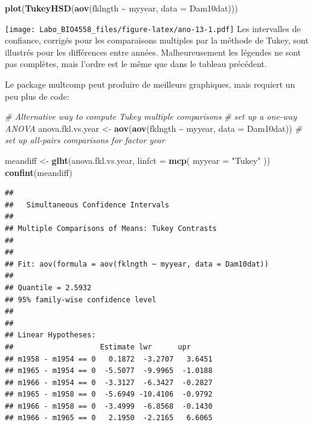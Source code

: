 \documentclass[
  12pt,
]{book}
\newenvironment{Shaded}{\begin{snugshade}}{\end{snugshade}}
\newcommand{\CommentTok}[1]{\textcolor[rgb]{0.56,0.35,0.01}{\textit{#1}}}
\newcommand{\DataTypeTok}[1]{\textcolor[rgb]{0.13,0.29,0.53}{#1}}
\newcommand{\KeywordTok}[1]{\textcolor[rgb]{0.13,0.29,0.53}{\textbf{#1}}}
\newcommand{\NormalTok}[1]{#1}
\newcommand{\OperatorTok}[1]{\textcolor[rgb]{0.81,0.36,0.00}{\textbf{#1}}}
\newcommand{\StringTok}[1]{\textcolor[rgb]{0.31,0.60,0.02}{#1}}
\begin{document}
\begin{Shaded}
\begin{Highlighting}[]
\KeywordTok{plot}\NormalTok{(}\KeywordTok{TukeyHSD}\NormalTok{(}\KeywordTok{aov}\NormalTok{(fklngth }\OperatorTok{\textasciitilde{}}\StringTok{ }\NormalTok{myyear, }\DataTypeTok{data =}\NormalTok{ Dam10dat)))}
\end{Highlighting}
\end{Shaded}

\texttt{[image: Labo\_BIO4558\_files/figure-latex/ano-13-1.pdf]}
Les intervalles de confiance, corrigés pour les comparaisons multiples par la méthode de Tukey, sont illustrés pour les différences entre années. Malheureusement les légendes ne sont pas complètes, mais l'ordre est le même que dans le tableau précédent.

Le package multcomp peut produire de meilleurs graphiques, mais requiert un peu plus de code:

\begin{Shaded}
\begin{Highlighting}[]
\CommentTok{\# Alternative way to compute Tukey multiple comparisons}
\CommentTok{\# set up a one{-}way ANOVA}
\NormalTok{anova.fkl.vs.year \textless{}{-}}\StringTok{ }\KeywordTok{aov}\NormalTok{(}\KeywordTok{aov}\NormalTok{(fklngth }\OperatorTok{\textasciitilde{}}\StringTok{ }\NormalTok{myyear, }\DataTypeTok{data =}\NormalTok{ Dam10dat))}
\CommentTok{\# set up all{-}pairs comparisons for factor \textasciigrave{}year\textquotesingle{}}

\NormalTok{meandiff \textless{}{-}}\StringTok{ }\KeywordTok{glht}\NormalTok{(anova.fkl.vs.year, }\DataTypeTok{linfct =} \KeywordTok{mcp}\NormalTok{(}
  \DataTypeTok{myyear =}
    \StringTok{"Tukey"}
\NormalTok{))}
\KeywordTok{confint}\NormalTok{(meandiff)}
\end{Highlighting}
\end{Shaded}

\begin{verbatim}
## 
##   Simultaneous Confidence Intervals
## 
## Multiple Comparisons of Means: Tukey Contrasts
## 
## 
## Fit: aov(formula = aov(fklngth ~ myyear, data = Dam10dat))
## 
## Quantile = 2.5932
## 95% family-wise confidence level
##  
## 
## Linear Hypotheses:
##                    Estimate lwr      upr     
## m1958 - m1954 == 0   0.1872  -3.2707   3.6451
## m1965 - m1954 == 0  -5.5077  -9.9965  -1.0188
## m1966 - m1954 == 0  -3.3127  -6.3427  -0.2827
## m1965 - m1958 == 0  -5.6949 -10.4106  -0.9792
## m1966 - m1958 == 0  -3.4999  -6.8568  -0.1430
## m1966 - m1965 == 0   2.1950  -2.2165   6.6065
\end{verbatim}
\end{document}
